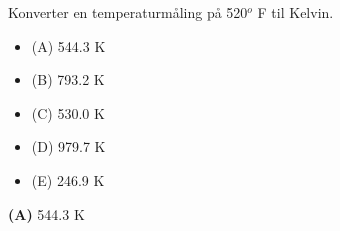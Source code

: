 

Konverter en temperaturmåling på 520$^{o}$ F til Kelvin.

\begin{itemize}
\item{(A)} 544.3 K
\vskip 5pt 
\item{(B)} 793.2 K
\vskip 5pt 
\item{(C)} 530.0 K
\vskip 5pt 
\item{(D)} 979.7 K
\vskip 5pt 
\item{(E)} 246.9 K
\end{itemize}







{\bf (A)} 544.3 K
 









